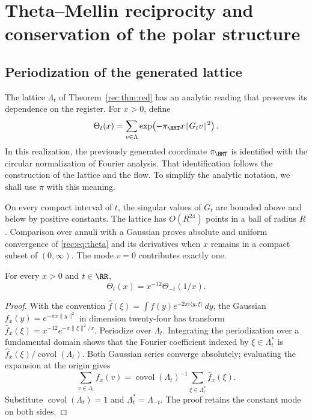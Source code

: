 \section{Theta--Mellin reciprocity and conservation of the polar structure}
\label{rec:espectral}

\subsection{Periodization of the generated lattice}

The lattice \(\Lambda_t\) of Theorem~\ref{rec:thm:red} has an analytic reading that preserves its dependence on the register. For \(x>0\), define
\begin{equation}
 \Theta_t(x)=\sum_{v\in\Lambda}
       \exp\!\left(-\pi_{\HMT}x\|G_tv\|^2\right).
 \label{rec:eq:theta}
\end{equation}
In this realization, the previously generated coordinate \(\pi_{\HMT}\) is identified with the circular normalization of Fourier analysis. That identification follows the construction of the lattice and the flow. To simplify the analytic notation, we shall use \(\pi\) with this meaning.

On every compact interval of \(t\), the singular values of \(G_t\) are bounded above and below by positive constants. The lattice has \(O(R^{24})\) points in a ball of radius \(R\). Comparison over annuli with a Gaussian proves absolute and uniform convergence of \eqref{rec:eq:theta} and its derivatives when \(x\) remains in a compact subset of \((0,\infty)\). The mode \(v=0\) contributes exactly one.

\begin{theorem}
\label{rec:thm:theta}
For every \(x>0\) and \(t\in\RR\),
\begin{equation}
 \Theta_t(x)=x^{-12}\Theta_{-t}(1/x).
 \label{rec:eq:theta-reciproca}
\end{equation}
\end{theorem}
\begin{proof}
With the convention \(\widehat f(\xi)=\int f(y)e^{-2\pi i\langle y,\xi\rangle}\,dy\), the Gaussian \(f_x(y)=e^{-\pi x\|y\|^2}\) in dimension twenty-four has transform
\(\widehat f_x(\xi)=x^{-12}e^{-\pi\|\xi\|^2/x}\).
Periodize over \(\Lambda_t\). Integrating the periodization over a fundamental domain shows that the Fourier coefficient indexed by \(\xi\in\Lambda_t^*\) is \(\widehat f_x(\xi)/\operatorname{covol}(\Lambda_t)\). Both Gaussian series converge absolutely; evaluating the expansion at the origin gives
\[
 \sum_{v\in\Lambda_t}f_x(v)
 =\operatorname{covol}(\Lambda_t)^{-1}
   \sum_{\xi\in\Lambda_t^*}\widehat f_x(\xi).
\]
Substitute \(\operatorname{covol}(\Lambda_t)=1\) and \(\Lambda_t^*=\Lambda_{-t}\). The proof retains the constant mode on both sides.
\end{proof}

